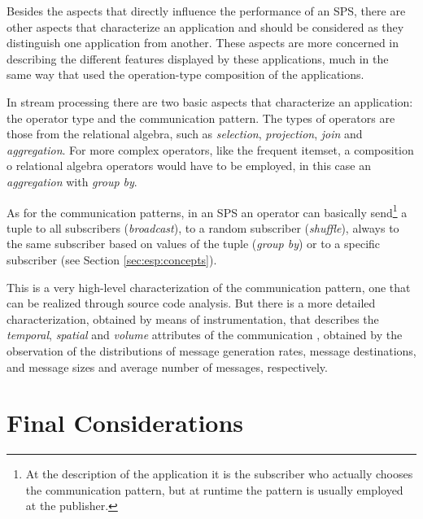 \documentclass[ppgc,diss,english]{iiufrgs}
\begin{document}


Besides the aspects that directly influence the performance of an SPS, there are other aspects that characterize an application and should be considered as they distinguish one application from another. These aspects are more concerned in describing the different features displayed by these applications, much in the same way that \cite{balaprakash2013exascale} used the operation-type composition of the applications.

In stream processing there are two basic aspects that characterize an application: the operator type and the communication pattern. The types of operators are those from the relational algebra, such as \emph{selection}, \emph{projection}, \emph{join} and \emph{aggregation}. For more complex operators, like the frequent itemset, a composition o relational algebra operators would have to be employed, in this case an \emph{aggregation} with \emph{group by}.

As for the communication patterns, in an SPS an operator can basically send\footnote{At the description of the application it is the subscriber who actually chooses the communication pattern, but at runtime the pattern is usually employed at the publisher.} a tuple to all subscribers (\emph{broadcast}), to a random subscriber (\emph{shuffle}), always to the same subscriber based on values of the tuple (\emph{group by}) or to a specific subscriber (see Section \ref{sec:esp:concepts}).

This is a very high-level characterization of the communication pattern, one that can be realized through source code analysis. But there is a more detailed characterization, obtained by means of instrumentation, that describes the \emph{temporal}, \emph{spatial} and \emph{volume} attributes of the communication \cite{kim1998characterization}, obtained by the observation of the distributions of message generation rates, message destinations, and message sizes and average number of messages, respectively.

\section{Final Considerations}
\end{document}
